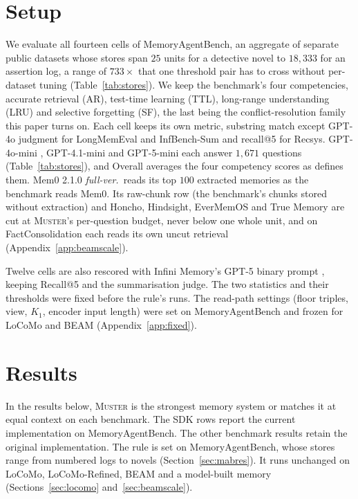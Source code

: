 \documentclass{article}
\newcommand{\sys}{\textsc{Muster}}
\begin{document}
\section{Setup}\label{sec:setup}

We evaluate all fourteen cells of MemoryAgentBench, an aggregate of separate public datasets whose stores span $25$ units for a detective novel to $18{,}333$ for an assertion log, a range of $733\times$ that one threshold pair has to cross without per-dataset tuning (Table~\ref{tab:stores}). We keep the benchmark's four competencies, accurate retrieval (AR), test-time learning (TTL), long-range understanding (LRU) and selective forgetting (SF), the last being the conflict-resolution family this paper turns on. Each cell keeps its own metric, substring match except GPT-4o judgment for LongMemEval and InfBench-Sum and recall@5 for Recsys. GPT-4o-mini \cite{gpt4omini}, GPT-4.1-mini \cite{gpt41} and GPT-5-mini \cite{gpt5} each answer $1{,}671$ questions (Table~\ref{tab:stores}), and Overall averages the four competency scores as \cite{mab} defines them. Mem0 2.1.0 \emph{full-ver.}\ reads its top $100$ extracted memories as the benchmark reads Mem0. Its raw-chunk row (the benchmark's chunks stored without extraction) and Honcho, Hindsight, EverMemOS and True Memory are cut at \sys{}'s per-question budget, never below one whole unit, and on FactConsolidation each reads its own uncut retrieval (Appendix~\ref{app:beamscale}).

Twelve cells are also rescored with Infini Memory's GPT-5 binary prompt \cite{infini}, keeping Recall@5 and the summarisation judge.
The two statistics and their thresholds were fixed before the rule's runs. The read-path settings (floor
triples, view, $K_1$, encoder input length) were set on MemoryAgentBench and frozen for LoCoMo and BEAM (Appendix~\ref{app:fixed}).

\section{Results}\label{sec:results}

In the results below, \sys{} is the strongest memory system or matches it at equal context on each benchmark. The SDK rows report the current implementation on MemoryAgentBench. The other benchmark results retain the original implementation. The rule is set on MemoryAgentBench, whose stores range from numbered logs to novels (Section~\ref{sec:mabres}). It runs unchanged on LoCoMo, LoCoMo-Refined, BEAM and a model-built memory (Sections~\ref{sec:locomo} and~\ref{sec:beamscale}).
\end{document}
